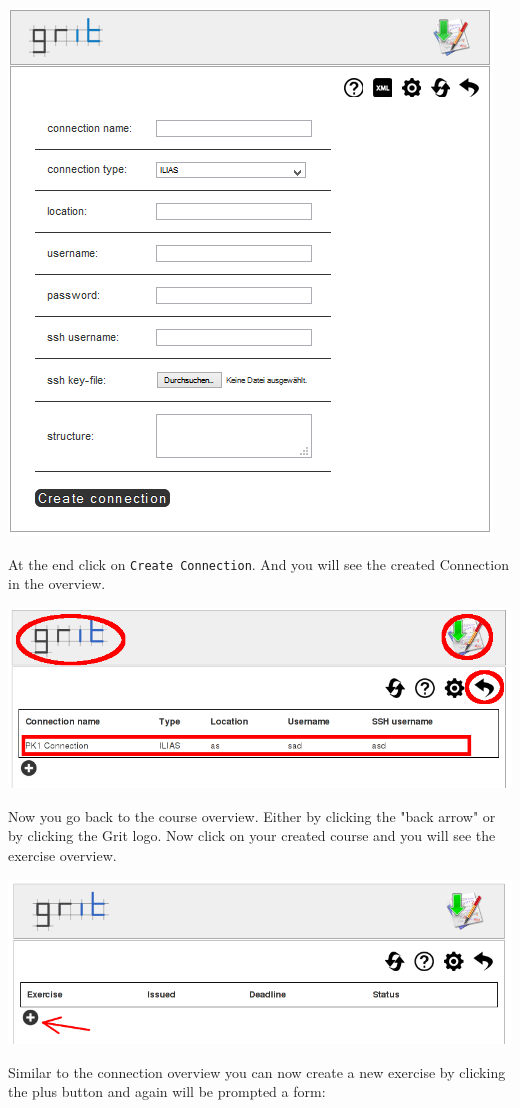 \documentclass[10pt,a4paper, titlepage, toc=idx]{scrreprt}
\theoremstyle{definition}
\theoremstyle{plain}
\newcommand*{\product}{Grit}
\begin{document}
	\begin{center}
          \includegraphics[width=.55\textwidth]{pictures/create_connection.png}
	\end{center}
	At the end click on {\tt Create Connection}. And you will see
        the created Connection in the overview.
	\begin{center}
          \includegraphics[width=.55\textwidth]{pictures/connection_overview2.png}
	\end{center}
	Now you go back to the course overview. Either by clicking the
        "back arrow" or by clicking the \product{} logo. Now click on
        your created course and you will see the exercise overview.
	\begin{center}
          \includegraphics[width=.55\textwidth]{pictures/exercise_overview.png}
	\end{center}
	Similar to the connection overview you can now create a new
        exercise by clicking the plus button and again will be
        prompted a form:
\end{document}
